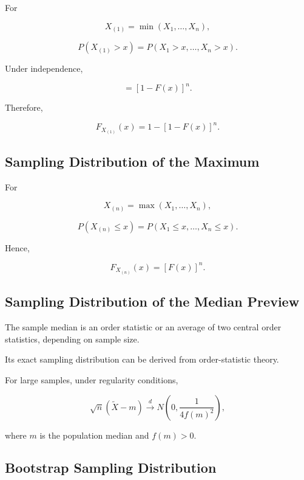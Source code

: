 For

\[
X_{(1)}
=
\min(X_1,\ldots,X_n),
\]

\[
P(X_{(1)}>x)
=
P(X_1>x,\ldots,X_n>x).
\]

Under independence,

\[
=
[1-F(x)]^n.
\]

Therefore,

\[
\boxed{
F_{X_{(1)}}(x)
=
1-[1-F(x)]^n.
}
\]

\subsection{Sampling Distribution of the Maximum}
\label{subsec:sample-maximum-distribution}

For

\[
X_{(n)}
=
\max(X_1,\ldots,X_n),
\]

\[
P(X_{(n)}\leq x)
=
P(X_1\leq x,\ldots,X_n\leq x).
\]

Hence,

\[
\boxed{
F_{X_{(n)}}(x)
=
[F(x)]^n.
}
\]

\subsection{Sampling Distribution of the Median Preview}
\label{subsec:sample-median-distribution-preview}

The sample median is an order statistic or an average of two central
order statistics, depending on sample size.

Its exact sampling distribution can be derived from order-statistic
theory.

For large samples, under regularity conditions,

\[
\boxed{
\sqrt{n}
(
\widetilde{X}-m
)
\xrightarrow{d}
N
\left(
0,
\frac{
1
}{
4f(m)^2
}
\right),
}
\]

where \(m\) is the population median and \(f(m)>0\).

\subsection{Bootstrap Sampling Distribution}
\label{subsec:bootstrap-sampling-distribution}

